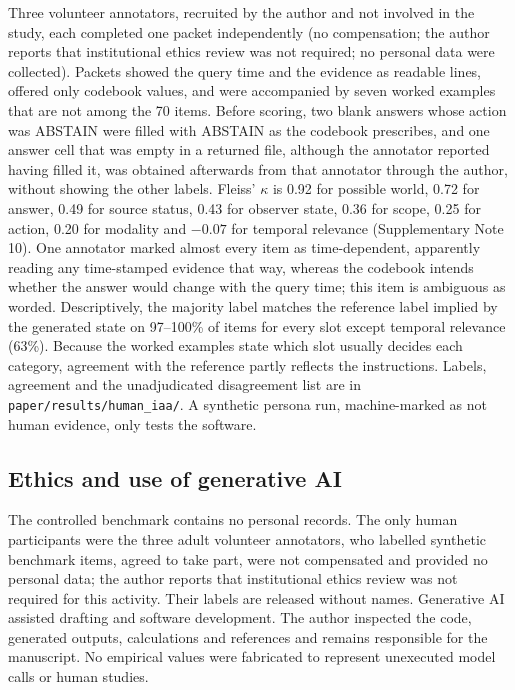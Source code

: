 Three volunteer annotators, recruited by the author and not involved in the
study, each completed one packet independently (no compensation; the author
reports that institutional ethics review was not required; no personal data
were collected). Packets showed the query time and the evidence as readable
lines, offered only codebook values, and were accompanied by seven worked
examples that are not among the 70 items. Before scoring, two blank answers
whose action was ABSTAIN were filled with ABSTAIN as the codebook prescribes,
and one answer cell that was empty in a returned file, although the annotator
reported having filled it, was obtained afterwards from that annotator through
the author, without showing the other labels. Fleiss'
$\kappa$ is 0.92 for possible world, 0.72 for answer, 0.49 for source status,
0.43 for observer state, 0.36 for scope, 0.25 for action, 0.20 for modality
and $-0.07$ for temporal relevance (Supplementary Note 10). One annotator
marked almost every item as time-dependent, apparently reading any time-stamped
evidence that way, whereas the codebook intends whether the answer would change
with the query time; this item is ambiguous as worded. Descriptively, the majority label
matches the reference label implied by the generated state on 97--100\% of
items for every slot except temporal relevance (63\%). Because the worked
examples state which slot usually decides each category, agreement with the
reference partly reflects the instructions. Labels, agreement and the
unadjudicated disagreement list are in \texttt{paper/results/human\_iaa/}.
A synthetic persona run, machine-marked as not human evidence, only tests the
software.

\subsection*{Ethics and use of generative AI}

The controlled benchmark contains no personal records. The only human
participants were the three adult volunteer annotators, who labelled synthetic
benchmark items, agreed to take part, were not compensated and provided no
personal data; the author reports that institutional ethics review was not
required for this activity. Their labels are released without names.
Generative AI assisted drafting and software development. The author inspected
the code, generated outputs, calculations and references and remains responsible
for the manuscript. No empirical values were fabricated to represent unexecuted
model calls or human studies.
